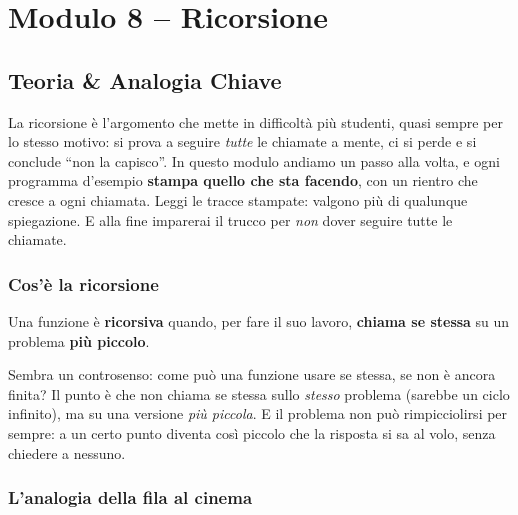\chapter{Modulo 8 -- Ricorsione}

\section{Teoria \& Analogia Chiave}

\begin{consiglio}
La ricorsione è l'argomento che mette in difficoltà più studenti, quasi sempre
per lo stesso motivo: si prova a seguire \emph{tutte} le chiamate a mente, ci si
perde e si conclude ``non la capisco''. In questo modulo andiamo un passo alla
volta, e ogni programma d'esempio \textbf{stampa quello che sta facendo}, con un
rientro che cresce a ogni chiamata. Leggi le tracce stampate: valgono più di
qualunque spiegazione. E alla fine imparerai il trucco per \emph{non} dover
seguire tutte le chiamate.
\end{consiglio}

\subsection*{Cos'è la ricorsione}

\begin{definizione}
Una funzione è \textbf{ricorsiva} quando, per fare il suo lavoro, \textbf{chiama
se stessa} su un problema \textbf{più piccolo}.
\end{definizione}

Sembra un controsenso: come può una funzione usare se stessa, se non è ancora
finita? Il punto è che non chiama se stessa sullo \emph{stesso} problema (sarebbe
un ciclo infinito), ma su una versione \emph{più piccola}. E il problema non può
rimpicciolirsi per sempre: a un certo punto diventa così piccolo che la risposta si
sa al volo, senza chiedere a nessuno.

\subsection*{L'analogia della fila al cinema}

